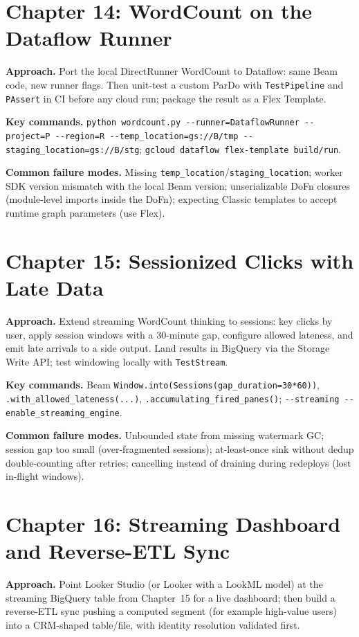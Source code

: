 \section{Chapter 14: WordCount on the Dataflow Runner}
\textbf{Approach.} Port the local DirectRunner WordCount to Dataflow: same Beam code, new runner
flags. Then unit-test a custom ParDo with \texttt{TestPipeline} and \texttt{PAssert} in CI before
any cloud run; package the result as a Flex Template.

\textbf{Key commands.} \texttt{python wordcount.py -{}-runner=DataflowRunner -{}-project=P
-{}-region=R -{}-temp\_location=gs://B/tmp -{}-staging\_location=gs://B/stg}; \texttt{gcloud
dataflow flex-template build/run}.

\textbf{Common failure modes.} Missing \texttt{temp\_location}/\texttt{staging\_location}; worker
SDK version mismatch with the local Beam version; unserializable DoFn closures (module-level
imports inside the DoFn); expecting Classic templates to accept runtime graph parameters (use
Flex).

\section{Chapter 15: Sessionized Clicks with Late Data}
\textbf{Approach.} Extend streaming WordCount thinking to sessions: key clicks by user, apply
session windows with a 30-minute gap, configure allowed lateness, and emit late arrivals to a side
output. Land results in BigQuery via the Storage Write API; test windowing locally with
\texttt{TestStream}.

\textbf{Key commands.} Beam \texttt{Window.into(Sessions(gap\_duration=30*60))},
\texttt{.with\_allowed\_lateness(...)}, \texttt{.accumulating\_fired\_panes()};
\texttt{-{}-streaming -{}-enable\_streaming\_engine}.

\textbf{Common failure modes.} Unbounded state from missing watermark GC; session gap too small
(over-fragmented sessions); at-least-once sink without dedup double-counting after retries;
cancelling instead of draining during redeploys (lost in-flight windows).

\section{Chapter 16: Streaming Dashboard and Reverse-ETL Sync}
\textbf{Approach.} Point Looker Studio (or Looker with a LookML model) at the streaming BigQuery
table from Chapter~15 for a live dashboard; then build a reverse-ETL sync pushing a computed
segment (for example high-value users) into a CRM-shaped table/file, with identity resolution
validated first.

